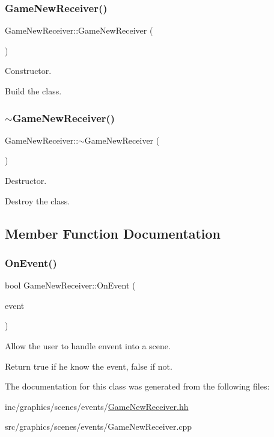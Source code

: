 \subsubsection{\texorpdfstring{Game\+New\+Receiver()}{GameNewReceiver()}}
{\footnotesize\ttfamily Game\+New\+Receiver\+::\+Game\+New\+Receiver (\begin{DoxyParamCaption}{ }\end{DoxyParamCaption})}



Constructor. 

Build the class. \mbox{\label{classGameNewReceiver_ab92b6653b56d291853a4e2f737eaf6fd}} 
\subsubsection{\texorpdfstring{$\sim$\+Game\+New\+Receiver()}{~GameNewReceiver()}}
{\footnotesize\ttfamily Game\+New\+Receiver\+::$\sim$\+Game\+New\+Receiver (\begin{DoxyParamCaption}{ }\end{DoxyParamCaption})}



Destructor. 

Destroy the class. 

\subsection{Member Function Documentation}
\mbox{\label{classGameNewReceiver_ad9ec097d8b46946ed1a21c24463fc0b6}} 
\subsubsection{\texorpdfstring{On\+Event()}{OnEvent()}}
{\footnotesize\ttfamily bool Game\+New\+Receiver\+::\+On\+Event (\begin{DoxyParamCaption}\item[{const irr\+::\+S\+Event \&}]{event }\end{DoxyParamCaption})}



Allow the user to handle envent into a scene. 

Return true if he know the event, false if not. 

The documentation for this class was generated from the following files\+:\begin{DoxyCompactItemize}
\item 
inc/graphics/scenes/events/\hyperlink{GameNewReceiver_8hh}{Game\+New\+Receiver.\+hh}\item 
src/graphics/scenes/events/Game\+New\+Receiver.\+cpp\end{DoxyCompactItemize}

